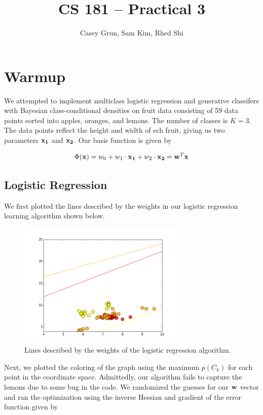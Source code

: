 \documentclass[11pt]{amsart}
\title{CS 181 -- Practical 3}
\author{Casey Grun, Sam Kim, Rhed Shi}
\begin{document}
\maketitle

\section{Warmup}

We attempted to implement multiclass logistic regression and generative classifers with Bayesian class-conditional densities on fruit data consisting of 59 data points sorted into apples, oranges, and lemons. The number of classes is $K = 3$. The data points reflect the height and width of ech fruit, giving us two parameters $\bold{x_1}$ and $\bold{x_2}$. Our basis function is given by

$$ \Phi(\bold{x}) = w_0 + w_1 \cdot \bold{x_1} + w_2 \cdot \bold{x_2}  = \bold{w}^T \bold{x} $$

\subsection{Logistic Regression}

We first plotted the lines described by the weights in our logistic regression learning algorithm shown below.

\begin{figure}
  \includegraphics[width=8cm]{figure_1.png}
  \caption{Lines described by the weights of the logistic regression algorithm.}
\end{figure}

\pagebreak

Next, we plotted the coloring of the graph using the maximum $p(C_k)$ for each point in the coordinate space. Admittedly, our algorithm fails to capture the lemons due to some bug in the code. We randomized the guesses for our $\bold{w}$ vector and ran the optimization using the inverse Hessian and gradient of the error function given by
\end{document}
